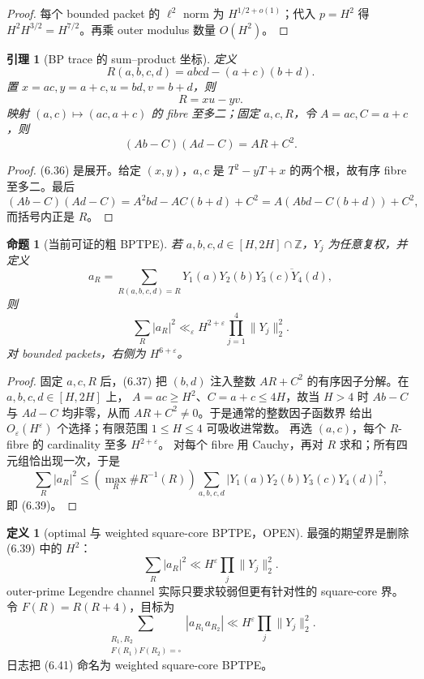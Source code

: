 \documentclass[11pt,a4paper]{ctexart}
\newtheorem{lemma}[theorem]{引理}
\newtheorem{proposition}[theorem]{命题}
\theoremstyle{definition}
\newtheorem{definition}[theorem]{定义}
\newcommand{\1}{\mathbf 1}
\newcommand{\OPEN}{\textcolor{red!70!black}{\textsf{OPEN}}}
\begin{document}
\begin{proof}
每个 bounded packet 的 $\ell^2$ norm 为 $H^{1/2+o(1)}$；代入
$p=H^2$ 得 $H^2H^{3/2}=H^{7/2}$。再乘 outer modulus 数量 $O(H^2)$。
\end{proof}

\begin{lemma}[BP trace 的 sum--product 坐标]\label{lem:bptrace}
定义
\[
R(a,b,c,d)=abcd-(a+c)(b+d).                            \tag{6.35}
\]
置 $x=ac,y=a+c,u=bd,v=b+d$，则
\[
\boxed{R=xu-yv}.                                      \tag{6.36}
\]
映射 $(a,c)\mapsto(ac,a+c)$ 的 fibre 至多二；固定 $a,c,R$，令
$A=ac,C=a+c$，则
\[
\boxed{(Ab-C)(Ad-C)=AR+C^2}.                          \tag{6.37}
\]
\end{lemma}

\begin{proof}
(6.36) 是展开。给定 $(x,y)$，$a,c$ 是 $T^2-yT+x$ 的两个根，故有序
fibre 至多二。最后
\[
(Ab-C)(Ad-C)=A^2bd-AC(b+d)+C^2=A(Abd-C(b+d))+C^2,
\]
而括号内正是 $R$。
\end{proof}

\begin{proposition}[当前可证的粗 BPTPE]\label{prop:crude-bptpe}
若 $a,b,c,d\in[H,2H]\cap\mathbb Z$，$Y_j$ 为任意复权，并定义
\[
a_R=\sum_{R(a,b,c,d)=R}Y_1(a)Y_2(b)\overline{Y_3(c)Y_4(d)},           \tag{6.38}
\]
则
\[
\sum_R|a_R|^2\ll_\varepsilon H^{2+\varepsilon}
\prod_{j=1}^4\|Y_j\|_2^2.                            \tag{6.39}
\]
对 bounded packets，右侧为 $H^{6+\varepsilon}$。
\end{proposition}

\begin{proof}
固定 $a,c,R$ 后，(6.37) 把 $(b,d)$ 注入整数
$AR+C^2$ 的有序因子分解。在 $a,b,c,d\in[H,2H]$ 上，
$A=ac\ge H^2$、$C=a+c\le4H$，故当 $H>4$ 时
$Ab-C$ 与 $Ad-C$ 均非零，从而 $AR+C^2\ne0$。于是通常的整数因子函数界
给出 $O_\varepsilon(H^\varepsilon)$ 个选择；有限范围 $1\le H\le4$ 可吸收进常数。
再选 $(a,c)$，每个 $R$-fibre 的 cardinality 至多 $H^{2+\varepsilon}$。
对每个 fibre 用 Cauchy，再对 $R$ 求和；所有四元组恰出现一次，于是
\[
\sum_R|a_R|^2
\le (\max_R\#R^{-1}(R))
\sum_{a,b,c,d}|Y_1(a)Y_2(b)Y_3(c)Y_4(d)|^2,
\]
即 (6.39)。
\end{proof}

\begin{definition}[optimal 与 weighted square-core BPTPE，\OPEN]
最强的期望界是删除 (6.39) 中的 $H^2$：
\[
\sum_R|a_R|^2\ll H^{\varepsilon}\prod_j\|Y_j\|_2^2. \tag{6.40}
\]
outer-prime Legendre channel 实际只要求较弱但更有针对性的 square-core 界。
令 $F(R)=R(R+4)$，目标为
\[
\sum_{\substack{R_1,R_2\\F(R_1)F(R_2)=\square}}
|a_{R_1}a_{R_2}|
\ll H^\varepsilon\prod_j\|Y_j\|_2^2.                 \tag{6.41}
\]
日志把 (6.41) 命名为 weighted square-core BPTPE。
\end{definition}
\end{document}
